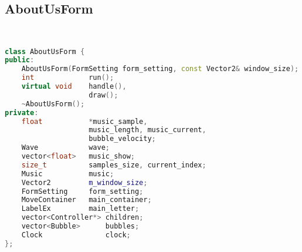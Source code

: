 \subsection{AboutUsForm}
\begin{lstlisting}[language=C++]


class AboutUsForm {
public:
    AboutUsForm(FormSetting form_setting, const Vector2& window_size);
    int             run();
    virtual void    handle(),
                    draw();
    ~AboutUsForm();
private:
    float           *music_sample, 
                    music_length, music_current,
                    bubble_velocity;
    Wave            wave;
    vector<float>   music_show;
    size_t          samples_size, current_index;
    Music           music;
    Vector2         m_window_size;
    FormSetting     form_setting;
    MoveContainer   main_container;
    LabelEx         main_letter;
    vector<Controller*> children;
    vector<Bubble>      bubbles;
    Clock               clock;
};




\end{lstlisting}
